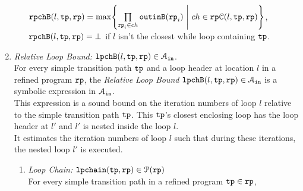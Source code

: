 \begin{enumerate}
\begin{enumerate}
  \\
  $\rpchB(l, \tpath, \rprog) = \max \left\{ \prod\limits_{\rprog_i \in ch}  \outinB(\rprog_i) 
  ~\middle\vert~ ch \in \rpchset(l, \tpath, \rprog) \right\}
  $,
  \\
  $\mathtt{rpchB}(l, \mathtt{tp}, \mathtt{rp}) = \bot$ if $l$ isn't the closest while loop containing $\mathtt{tp}$.
  \end{enumerate}
%
\item \emph{Relative Loop Bound:} $\mathtt{lpchB}(l, \mathtt{tp}, \mathtt{rp}) \in \mathcal{A}_{\mathtt{in}}$.
\\
For every simple transition path $\mathtt{tp}$
and a loop header at location $l$ in a refined program $\mathtt{rp}$,
the \emph{Relative Loop Bound} $\mathtt{lpchB}(l, \mathtt{tp}, \mathtt{rp}) \in \mathcal{A}_{\mathtt{in}}$ is a symbolic expression in $\mathcal{A}_{\mathtt{in}}$.
\\
This expression is a sound bound on the iteration numbers of loop $l$ relative to the simple transition path $\mathtt{tp}$.
This $\mathtt{tp}$'s closest enclosing loop has the loop header at $l'$ and $l'$ is nested inside the loop $l$.
\\
It estimates the iteration numbers of loop $l$ such that during these iterations, the nested loop $l'$ is executed.
\begin{enumerate}
  \item \emph{Loop Chain:} $\mathtt{lpchain}(\mathtt{tp}, \mathtt{rp}) \in \mathcal{P}(\mathtt{rp})$ 
  \\
  For every simple transition path in a refined program $\mathtt{tp} \in \mathtt{rp}$,

\end{enumerate}
\end{enumerate}
